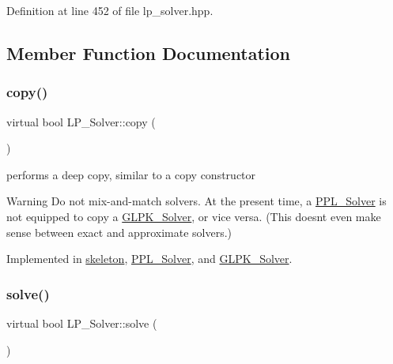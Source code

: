 Definition at line 452 of file lp\+\_\+solver.\+hpp.



\subsection{Member Function Documentation}
\mbox{\label{class_l_p___solver_a442ad4ad67ee2feff0df49e9201d61ca}} 
\subsubsection{\texorpdfstring{copy()}{copy()}}
{\footnotesize\ttfamily virtual bool L\+P\+\_\+\+Solver\+::copy (\begin{DoxyParamCaption}\item[{const \hyperlink{class_l_p___solver}{L\+P\+\_\+\+Solver} $\ast$}]{ }\end{DoxyParamCaption})\hspace{0.3cm}{\ttfamily [pure virtual]}}



performs a deep copy, similar to a copy constructor 

\begin{DoxyWarning}{Warning}
Do not mix-\/and-\/match solvers. At the present time, a \hyperlink{class_p_p_l___solver}{P\+P\+L\+\_\+\+Solver} is not equipped to copy a \hyperlink{class_g_l_p_k___solver}{G\+L\+P\+K\+\_\+\+Solver}, or vice versa. (This doesn\textquotesingle{}t even make sense between exact and approximate solvers.) 
\end{DoxyWarning}


Implemented in \hyperlink{classskeleton_a42d30b92f27936eab11d0fa4f0cc10b4}{skeleton}, \hyperlink{class_p_p_l___solver_a67408174d2260de5ae5f070a70f27e9d}{P\+P\+L\+\_\+\+Solver}, and \hyperlink{class_g_l_p_k___solver_aff3a58ef3def363dfad9e0ba8eee3e67}{G\+L\+P\+K\+\_\+\+Solver}.

\mbox{\label{class_l_p___solver_abd84374c52124116becc8924dc74e12d}} 
\subsubsection{\texorpdfstring{solve()}{solve()}\hspace{0.1cm}{\footnotesize\ttfamily [1/2]}}
{\footnotesize\ttfamily virtual bool L\+P\+\_\+\+Solver\+::solve (\begin{DoxyParamCaption}\item[{\hyperlink{classconstraint}{constraint} \&}]{ }\end{DoxyParamCaption})\hspace{0.3cm}{\ttfamily [pure virtual]}}



